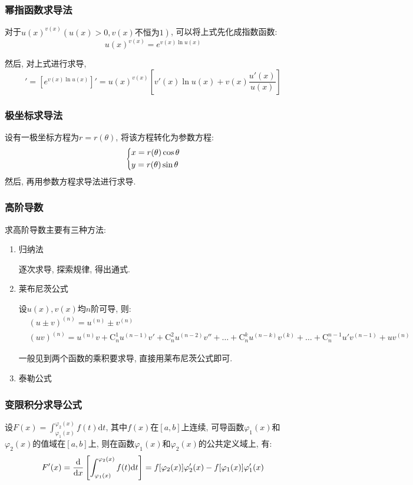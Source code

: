 \subsubsection{幂指函数求导法}
对于$ u(x)^{v(x)}(u(x)>0,v(x)\text{不恒为}1) $, 可以将上式先化成指数函数:
\begin{equation*}
u(x)^{v(x)}=e^{v(x)\ln u(x)}
\end{equation*}\par 
然后, 对上式进行求导,
\begin{equation*}
[u(x)^{v(x)}]'=[e^{v(x)\ln u(x)}]'=u(x)^{v(x)}[v'(x)\ln u(x)+v(x)\frac{u'(x)}{u(x)}]
\end{equation*}
\subsubsection{极坐标求导法}
设有一极坐标方程为$ r=r(\theta) $, 将该方程转化为参数方程:
\begin{equation*}
\scaleleftright[6pt]{\biggl\{}{
\begin{aligned}
& x=r(\theta)\cos \theta \\
& y=r(\theta)\sin \theta
\end{aligned} }{.}
\end{equation*}
然后, 再用参数方程求导法进行求导.
\subsubsection{高阶导数}
求高阶导数主要有三种方法:
\begin{enumerate}
\item 归纳法 \par 逐次求导, 探索规律, 得出通式.
\item 莱布尼茨公式 \par 设$ u(x),v(x) $均$ n $阶可导, 则:
\begin{equation*}
\begin{aligned}
& (u\pm v)^{(n)}=u^{(n)}\pm v^{(n)} \\
& (uv)^{(n)}=u^{(n)}v+\mathrm{C}_{n}^{1}u^{(n-1)}v'+\mathrm{C}_{n}^{2}u^{(n-2)}v''+\dots+\mathrm{C}_{n}^{k}u^{(n-k)}v^{(k)}+\dots+\mathrm{C}_{n}^{n-1}u'v^{(n-1)}+uv^{(n)}
\end{aligned}
\end{equation*}\par
一般见到两个函数的乘积要求导, 直接用莱布尼茨公式即可.
\item 泰勒公式
\end{enumerate}
\subsubsection{变限积分求导公式}
设$ F(x)=\int_{\varphi_{1}(x)}^{\varphi_{2}(x)}f(t)\mathrm{d}t $, 其中$ f(x) $在$ [a,b] $上连续, 可导函数$ \varphi_{1}(x) $和$ \varphi_{2}(x) $的值域在$ [a,b] $上, 则在函数$ \varphi_{1}(x) $和$ \varphi_{2}(x) $的公共定义域上, 有:
\begin{equation*}
F'(x)=\dv{}{x}\left[\int_{\varphi_{1}(x)}^{\varphi_{2}(x)}f(t)\mathrm{d}t\right]=f[\varphi_{2}(x)]\varphi'_{2}(x)-f[\varphi_{1}(x)]\varphi'_{1}(x)
\end{equation*}
